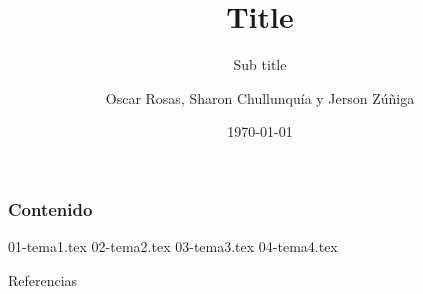 \documentclass[9pt]{beamer}
\title{Title}
\subtitle{Sub title}
\author{Oscar Rosas, Sharon Chullunquía y Jerson Zúñiga}
\institute[UNSA]{Universidad Nacional de San Agustín de Arequipa}
\date{\today}
\begin{document}
\titlepage

\begin{frame}
  \frametitle{Contenido}
  \tableofcontents
\end{frame}

{01-tema1.tex}
{02-tema2.tex}
{03-tema3.tex}
{04-tema4.tex}

\begin{frame}[allowframebreaks]{Referencias}
  \nocite{*}
  
  
\end{frame}
\end{document}

